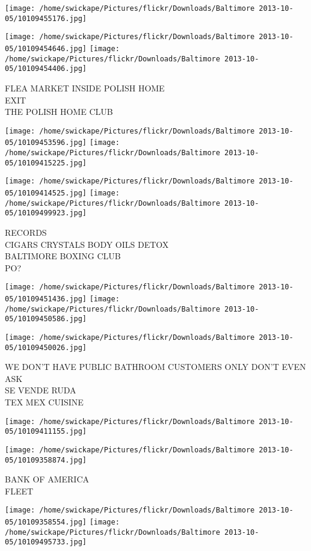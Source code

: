 \documentclass[10pt,letterpaper]{article}
\begin{document}
\texttt{[image: /home/swickape/Pictures/flickr/Downloads/Baltimore 2013-10-05/10109455176.jpg]}

\vspace{0.25in}
\texttt{[image: /home/swickape/Pictures/flickr/Downloads/Baltimore 2013-10-05/10109454646.jpg]}
\texttt{[image: /home/swickape/Pictures/flickr/Downloads/Baltimore 2013-10-05/10109454406.jpg]}

FLEA MARKET INSIDE POLISH HOME\\
EXIT\\
THE POLISH HOME CLUB
\pagebreak

\texttt{[image: /home/swickape/Pictures/flickr/Downloads/Baltimore 2013-10-05/10109453596.jpg]}
\texttt{[image: /home/swickape/Pictures/flickr/Downloads/Baltimore 2013-10-05/10109415225.jpg]}

\texttt{[image: /home/swickape/Pictures/flickr/Downloads/Baltimore 2013-10-05/10109414525.jpg]}
\texttt{[image: /home/swickape/Pictures/flickr/Downloads/Baltimore 2013-10-05/10109499923.jpg]}

RECORDS\\
CIGARS CRYSTALS BODY OILS DETOX\\
BALTIMORE BOXING CLUB\\
PO?
\pagebreak

\texttt{[image: /home/swickape/Pictures/flickr/Downloads/Baltimore 2013-10-05/10109451436.jpg]}
\texttt{[image: /home/swickape/Pictures/flickr/Downloads/Baltimore 2013-10-05/10109450586.jpg]}

\texttt{[image: /home/swickape/Pictures/flickr/Downloads/Baltimore 2013-10-05/10109450026.jpg]}

WE DON'T HAVE PUBLIC BATHROOM CUSTOMERS ONLY DON'T EVEN ASK\\
SE VENDE RUDA\\
TEX MEX CUISINE
\pagebreak

\texttt{[image: /home/swickape/Pictures/flickr/Downloads/Baltimore 2013-10-05/10109411155.jpg]}

\vspace{0.25in}
\texttt{[image: /home/swickape/Pictures/flickr/Downloads/Baltimore 2013-10-05/10109358874.jpg]}

BANK OF AMERICA\\
FLEET
\pagebreak

\texttt{[image: /home/swickape/Pictures/flickr/Downloads/Baltimore 2013-10-05/10109358554.jpg]}
\texttt{[image: /home/swickape/Pictures/flickr/Downloads/Baltimore 2013-10-05/10109495733.jpg]}
\end{document}
